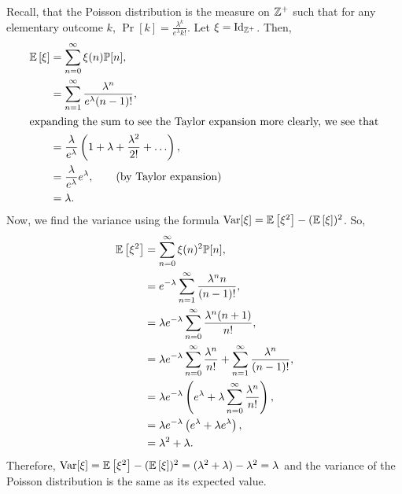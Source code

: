 \begin{problem}{7}
\end{problem}
\begin{solution}
    Recall, that the Poisson distribution is the measure on $\mathbb{Z}^+$ such that for
    any elementary outcome $k$, $\Pr\left[{k}\right] =
    \frac{\lambda^k}{e^\lambda k!}$. Let $\xi = \operatorname{Id}_{\mathbb{Z}^+}$. Then, 
    \begin{align*}
        \mathbb{E}\left[\xi\right] &= \sum_{n=0}^\infty \xi(n)\mathbb{P}[{n}], \\
        &= \sum_{n=1}^\infty \frac{\lambda^n}{e^\lambda (n-1)!}, \\
        \intertext{expanding the sum to see the Taylor expansion more clearly, we see that}
        &= \frac{\lambda}{e^\lambda}\left(1 + \lambda + \frac{\lambda^2}{2!} + \ldots \right), \\
        &= \frac{\lambda}{e^\lambda}e^\lambda, \tag{by Taylor expansion} \\
        &= \lambda.
    \end{align*}
    Now, we find the variance using the formula $\operatorname{Var}[\xi] = \mathbb{E}\left[\xi^2\right] - (\mathbb{E}\left[\xi\right])^2$. So,
    \begin{align*}
        \mathbb{E}\left[\xi^2\right] &= \sum_{n=0}^\infty \xi(n)^2\mathbb{P}[n], \\
        &= e^{-\lambda}\sum_{n=1}^\infty \frac{\lambda^n n}{(n-1)!}, \\
        &= \lambda e^{-\lambda} \sum_{n=0}^\infty \frac{\lambda^n (n+1)}{n!}, \\
        &= \lambda e^{-\lambda} \sum_{n=0}^\infty \frac{\lambda^n}{n!} + \sum_{n=1}^\infty \frac{\lambda^n}{(n-1)!}, \\
        &= \lambda e^{-\lambda} \left(e^\lambda + \lambda \sum_{n=0}^\infty \frac{\lambda^n}{n!}\right), \\
        &= \lambda e^{-\lambda} \left(e^\lambda + \lambda e^\lambda\right), \\
        &= \lambda^2 + \lambda.
    \end{align*}
    Therefore, $\operatorname{Var}[\xi] = \mathbb{E}\left[\xi^2\right] - (\mathbb{E}\left[\xi\right])^2 = (\lambda^2 + \lambda) - \lambda^2 = \lambda$ and the variance of the Poisson distribution is the same as its expected value.
\end{solution}
\begin{problem}{9}
\end{problem}

